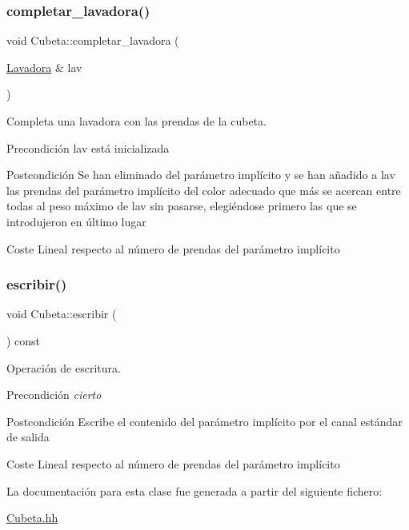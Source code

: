 \subsubsection{\texorpdfstring{completar\+\_\+lavadora()}{completar\_lavadora()}}
{\footnotesize\ttfamily void Cubeta\+::completar\+\_\+lavadora (\begin{DoxyParamCaption}\item[{\mbox{\hyperlink{class_lavadora}{Lavadora}} \&}]{lav }\end{DoxyParamCaption})}



Completa una lavadora con las prendas de la cubeta. 

\begin{DoxyPrecond}{Precondición}
lav está inicializada 
\end{DoxyPrecond}
\begin{DoxyPostcond}{Postcondición}
Se han eliminado del parámetro implícito y se han añadido a lav las prendas del parámetro implícito del color adecuado que más se acercan entre todas al peso máximo de lav sin pasarse, elegiéndose primero las que se introdujeron en último lugar 
\end{DoxyPostcond}
\begin{DoxyParagraph}{Coste Lineal respecto al número de prendas del parámetro implícito }

\end{DoxyParagraph}
\mbox{\label{class_cubeta_a3153ac390389f689bead058cd0b1690e}} 
\subsubsection{\texorpdfstring{escribir()}{escribir()}}
{\footnotesize\ttfamily void Cubeta\+::escribir (\begin{DoxyParamCaption}{ }\end{DoxyParamCaption}) const}



Operación de escritura. 

\begin{DoxyPrecond}{Precondición}
{\itshape cierto} 
\end{DoxyPrecond}
\begin{DoxyPostcond}{Postcondición}
Escribe el contenido del parámetro implícito por el canal estándar de salida 
\end{DoxyPostcond}
\begin{DoxyParagraph}{Coste Lineal respecto al número de prendas del parámetro implícito }

\end{DoxyParagraph}


La documentación para esta clase fue generada a partir del siguiente fichero\+:\begin{DoxyCompactItemize}
\item 
\mbox{\hyperlink{_cubeta_8hh}{Cubeta.\+hh}}\end{DoxyCompactItemize}
